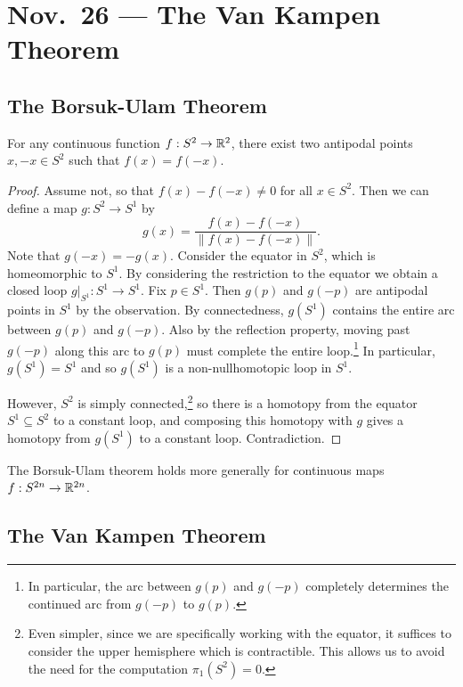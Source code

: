 \chapter{Nov.~26 --- The Van Kampen Theorem}

\section{The Borsuk-Ulam Theorem}

\begin{theorem}
  For any continuous function $f : S^2 \to \mathbb{R}^2$,
  there exist two antipodal points
  $x, -x \in S^2$ such that $f(x) = f(-x)$.
\end{theorem}

\begin{proof}
  Assume not, so that $f(x) - f(-x) \ne 0$ for all $x \in S^2$.
  Then we can define a map
  $g : S^2 \to S^1$ by
  \[
    g(x) = \frac{f(x) - f(-x)}{\|f(x) - f(-x)\|}.
  \]
  Note that $g(-x) = -g(x)$. Consider the
  equator in $S^2$, which is homeomorphic to $S^1$.
  By considering the restriction to the
  equator we obtain a closed loop
  $g|_{S^1} : S^1 \to S^1$. Fix $p \in S^1$. Then
  $g(p)$ and $g(-p)$ are antipodal points in $S^1$
  by the observation. By connectedness,
  $g(S^1)$ contains the entire arc between
  $g(p)$ and $g(-p)$. Also by the reflection property,
  moving past $g(-p)$ along this arc to $g(p)$ must
  complete the entire loop.\footnote{In particular, the arc between $g(p)$ and $g(-p)$ completely determines the continued arc from $g(-p)$ to $g(p)$.} In particular,
  $g(S^1) = S^1$ and so $g(S^1)$ is a
  non-nullhomotopic loop in $S^1$.

  However, $S^2$ is simply connected,\footnote{Even simpler, since we are specifically working with the equator, it suffices to consider the upper hemisphere which is contractible. This allows us to avoid the need for the computation $\pi_1(S^2) = 0$.} so
  there is a homotopy from the equator
  $S^1 \subseteq S^2$ to a constant loop, and
  composing this homotopy with $g$ gives a homotopy
  from $g(S^1)$ to a constant loop.
  Contradiction.
\end{proof}

\begin{remark}
  The Borsuk-Ulam theorem holds more generally for
  continuous maps $f : S^{2n} \to \mathbb{R}^{2n}$.
\end{remark}

\section{The Van Kampen Theorem}

